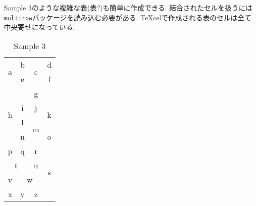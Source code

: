 \documentclass{jsarticle}
\begin{document}
\newpage
Sample 3のような複雑な表(表?)も簡単に作成できる.
結合されたセルを扱うには\verb|multirow|パッケージを読み込む必要がある.
TeXcelで作成される表のセルは全て中央寄せになっている.
\vspace{-0.5em}
\begin{table}[htb]
	\captionsetup{labelformat=empty,labelsep=none}
	\caption{Sample 3}
	\label{sample3}
	\centering
	\begin{tabular}{|c|c|c|c|}\hline
		\multicolumn{1}{|c|}{\multirow{3}{*}{a}}	&b	&\multicolumn{1}{|c|}{\multirow{2}{*}{c}}	&d	\\ \cline{2-2}\cline{4-4}
		\multicolumn{1}{|c|}{}	&e	&\multicolumn{1}{|c|}{}	&f	\\ \cline{2-4}
		\multicolumn{1}{|c|}{}	&\multicolumn{3}{|c|}{\multirow{2}{*}{g}}	\\ \cline{1-1}
		\multicolumn{1}{|c|}{\multirow{4}{*}{h}}	&\multicolumn{3}{|c|}{}	\\ \cline{2-4}
		\multicolumn{1}{|c|}{}	&i	&j	&\multicolumn{1}{|c|}{\multirow{2}{*}{k}}	\\ \cline{2-3}
		\multicolumn{1}{|c|}{}	&l	&\multicolumn{1}{|c|}{\multirow{2}{*}{m}}	&\multicolumn{1}{|c|}{}	\\ \cline{2-2}\cline{4-4}
		\multicolumn{1}{|c|}{}	&n	&\multicolumn{1}{|c|}{}	&o	\\ \hline
		p	&q	&\multicolumn{1}{|c|}{\multirow{2}{*}{r}}	&\multicolumn{1}{|c|}{\multirow{5}{*}{s}}	\\ \cline{1-2}
		\multicolumn{2}{|c|}{\multirow{2}{*}{t}}	&\multicolumn{1}{|c|}{}	&\multicolumn{1}{|c|}{}	\\ \cline{3-3}
		\multicolumn{2}{|c|}{}	&u	&\multicolumn{1}{|c|}{}	\\ \cline{1-3}
		v	&\multicolumn{2}{|c|}{\multirow{1}{*}{w}}	&\multicolumn{1}{|c|}{}	\\ \cline{1-3}
		x	&y	&z	&\multicolumn{1}{|c|}{}	\\ \hline
	\end{tabular}
\end{table}
\end{document}
